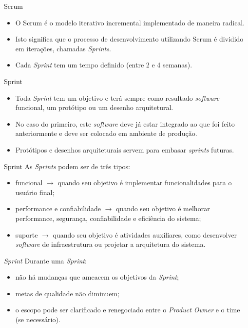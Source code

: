 \documentclass[11pt]{beamer}
\begin{document}
    \begin{frame}{Scrum}
      \begin{itemize}
         \item O Scrum é o modelo iterativo incremental implementado de maneira radical.
         \item Isto significa que o processo de desenvolvimento utilizando Scrum é dividido em iterações, chamadas \textit{Sprints}.
          \item Cada \textit{Sprint} tem um tempo definido (entre 2 e 4 semanas).
      \end{itemize}
    \end{frame}

    \begin{frame}{Sprint}
       \begin{itemize}
          \item Toda \textit{Sprint} tem um objetivo e terá sempre como resultado \textit{software} funcional, um protótipo ou um desenho arquitetural.
          \item No caso do primeiro, este \textit{software} deve já estar integrado ao que foi feito anteriormente e deve ser colocado em ambiente de produção.
          \item Protótipos e desenhos arquiteturais servem para embasar \textit{sprints} futuras.
       \end{itemize}
    \end{frame}
    
    \begin{frame}{Sprint}
       As \textit{Sprints} podem ser de três tipos:
       \begin{itemize}
          \item funcional $\rightarrow$ quando seu objetivo é implementar funcionalidades para o usuário final;
          \item performance e confiabilidade $\rightarrow$ quando seu objetivo é melhorar performance, segurança, confiabilidade e eficiência do sistema;
          \item suporte $\rightarrow$ quando seu objetivo é atividades auxiliares, como desenvolver \textit{software} de infraestrutura ou projetar a arquitetura do sistema.
       \end{itemize}
    \end{frame}    

    \begin{frame}{\textit{Sprint}}
      Durante uma \textit{Sprint}:
      \begin{itemize}
         \item não há mudanças que ameacem os objetivos da \textit{Sprint};
         \item metas de qualidade não diminuem;
         \item o escopo pode ser clarificado e renegociado entre o \textit{Product Owner} e o time (se necessário).
      \end{itemize}
    \end{frame}
\end{document}
